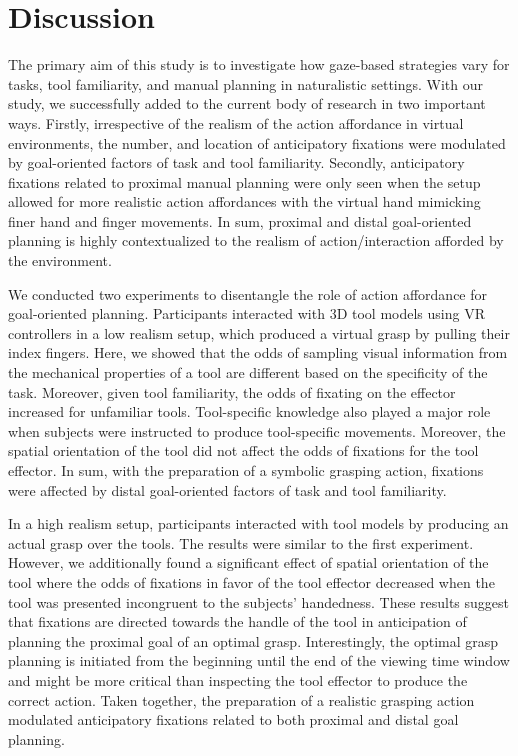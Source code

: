\section{Discussion}

The primary aim of this study is to investigate how gaze-based strategies vary for tasks, tool familiarity, and manual planning in naturalistic settings. With our study, we successfully added to the current body of research in two important ways. Firstly, irrespective of the realism of the action affordance in virtual environments, the number, and location of anticipatory fixations were modulated by goal-oriented factors of task and tool familiarity. Secondly, anticipatory fixations related to proximal manual planning were only seen when the setup allowed for more realistic action affordances with the virtual hand mimicking finer hand and finger movements. In sum, proximal and distal goal-oriented planning is highly contextualized to the realism of action/interaction afforded by the environment.


We conducted two experiments to disentangle the role of action affordance for goal-oriented planning. Participants interacted with 3D tool models using VR controllers in a low realism setup, which produced a virtual grasp by pulling their index fingers. Here, we showed that the odds of sampling visual information from the mechanical properties of a tool are different based on the specificity of the task. Moreover, given tool familiarity, the odds of fixating on the effector increased for unfamiliar tools. Tool-specific knowledge also played a major role when subjects were instructed to produce tool-specific movements. Moreover, the spatial orientation of the tool did not affect the odds of fixations for the tool effector. In sum, with the preparation of a symbolic grasping action, fixations were affected by distal goal-oriented factors of task and tool familiarity. 

In a high realism setup, participants interacted with tool models by producing an actual grasp over the tools. The results were similar to the first experiment. However, we additionally found a significant effect of spatial orientation of the tool where the odds of fixations in favor of the tool effector decreased when the tool was presented incongruent to the subjects’ handedness. These results suggest that fixations are directed towards the handle of the tool in anticipation of planning the proximal goal of an optimal grasp. Interestingly, the optimal grasp planning is initiated from the beginning until the end of the viewing time window and might be more critical than inspecting the tool effector to produce the correct action. Taken together, the preparation of a realistic grasping action modulated anticipatory fixations related to both proximal and distal goal planning.


